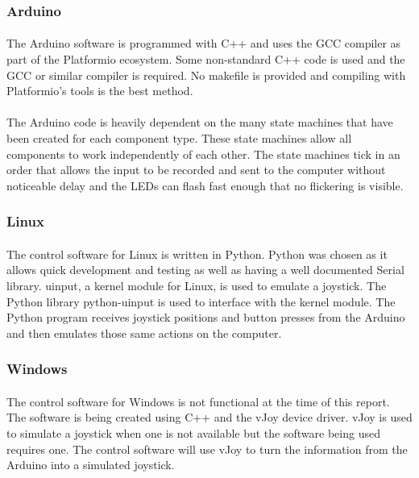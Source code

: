 \documentclass[12pt,a4paper]{article}
\begin{document}
			\subsubsection{Arduino}
				\paragraph{}
					The Arduino software is programmed with C++ and uses the \gls{GCC} compiler as part of the Platformio ecosystem. Some non-standard C++ code is used and the \gls{GCC} or similar compiler is required. No makefile is provided and compiling with Platformio's tools is the best method.
				\paragraph{}
					The Arduino code is heavily dependent on the many state machines that have been created for each component type. These state machines allow all components to work independently of each other. The state machines tick in an order that allows the input to be recorded and sent to the computer without noticeable delay and the \glspl{LED} can flash fast enough that no flickering is visible.
			\subsubsection{Linux}
				\paragraph{}
					The control software for Linux is written in Python. Python was chosen as it allows quick development and testing as well as having a well documented Serial library. uinput, a kernel module for Linux, is used to emulate a joystick. The Python library python-uinput is used to interface with the kernel module. The Python program receives joystick positions and button presses from the Arduino and then emulates those same actions on the computer.
			\subsubsection{Windows}
				\paragraph{}
					The control software for Windows is not functional at the time of this report. The software is being created using C++ and the vJoy device driver. vJoy is used to simulate a joystick when one is not available but the software being used requires one. The control software will use vJoy to turn the information from the Arduino into a simulated joystick.
\end{document}
